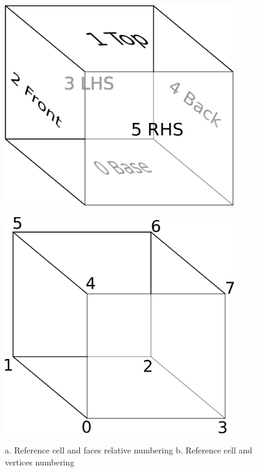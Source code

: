\begin{figure}[h]
	\begin{minipage}[t]{0.5 \textwidth}
		\begin{center}{\includegraphics[width=0.9\textwidth]{RefCellFace.pdf}}
		\end{center}
	\end{minipage}%
	\begin{minipage}[t]{0.5 \textwidth}
		\begin{center}{\includegraphics[width=0.9\textwidth]{RefCellVertex.pdf}}
		\end{center}
	\end{minipage}%
	\caption{\label{RC}a. Reference cell and faces relative numbering \hspace{2mm} b. Reference cell and vertices numbering}
\end{figure}

